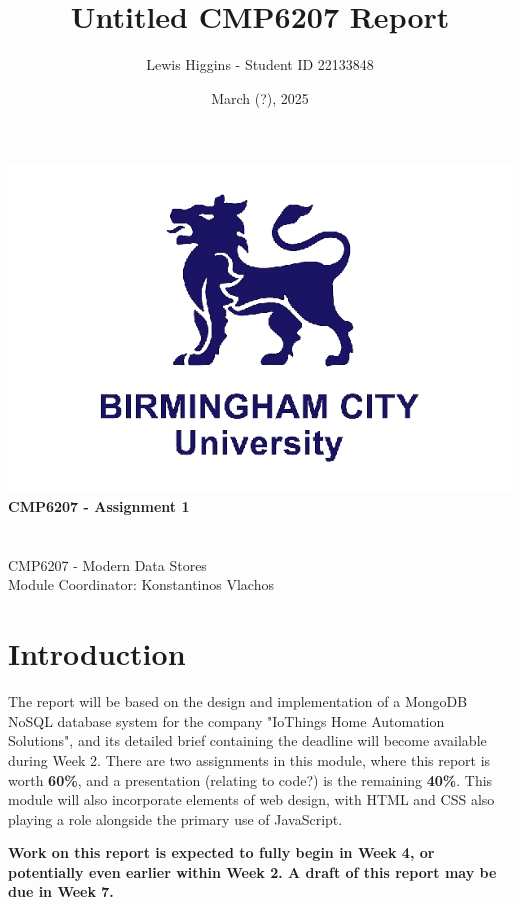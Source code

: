\documentclass[12pt]{report}
\title{Untitled CMP6207 Report}
\author{Lewis Higgins - Student ID 22133848}
\date{March (?), 2025}
\newcommand{\para}{\vspace{7pt}\noindent}
\begin{document}
\makeatletter
\begin{titlepage}
    \begin{center}
        \includegraphics[width=0.7\linewidth]{BCU}\\[4ex]
        {\huge \bfseries CMP6207 - Assignment 1}\\[2ex]
        {\large \bfseries  \@title}\\[50ex]
        {\@author}\\[2ex]
        {CMP6207 - Modern Data Stores}\\[2ex]
        {Module Coordinator: Konstantinos Vlachos}\\[5ex]
    \end{center}
\end{titlepage}
\makeatother
\thispagestyle{empty}
\newpage


\setcounter{page}{0}

\tableofcontents
\thispagestyle{empty}

\chapter*{Introduction}
The report will be based on the design and implementation of a MongoDB NoSQL database system 
for the company "IoThings Home Automation Solutions", and its detailed brief containing the deadline
will become available during Week 2. There are two assignments in this module, where this report is
worth \textbf{60\%}, and a presentation (relating to code?) is the remaining \textbf{40\%}. This module 
will also incorporate elements of web design, with HTML and CSS also playing a role alongside the primary 
use of JavaScript.

\para \textbf{Work on this report is expected to fully begin in Week 4, or potentially even earlier within Week 2. 
A draft of this report may be due in Week 7.}
\end{document}
